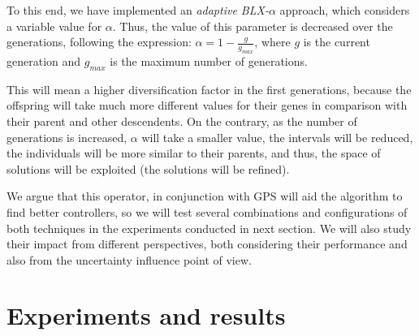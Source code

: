 \documentclass[10pt,journal,compsoc]{IEEEtran}
\begin{document}
To this end, we have implemented an \textit{adaptive BLX-$\alpha$}
approach, which considers a variable value for $\alpha$. Thus, the
value of this parameter is decreased over the generations, following
the expression: $\alpha =1-\frac{g}{g_{max}}$, where $g$ is the
current generation and $g_{max}$ is the maximum number of generations.

This will mean a higher diversification factor in the first generations, because the offspring will take much more different values for their genes in comparison with their parent and other descendents. %
On the contrary, as the number of generations is increased, $\alpha$ will take a smaller value, the intervals will be reduced, the individuals will be more similar to their parents, and thus, the space of solutions will be exploited (the solutions will be refined).

We argue that this operator, in conjunction with GPS will aid the algorithm to find better controllers, so we will test several combinations and configurations of both techniques in the experiments conducted in next section. We will also study their impact from different perspectives, both considering their performance and also from the uncertainty influence point of view.



\section{Experiments and results}  
\label{sec:results}
\end{document}
